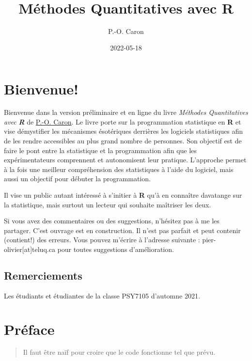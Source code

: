 \documentclass[
]{book}
\title{Méthodes Quantitatives avec R}
\author{P.-O. Caron}
\date{2022-05-18}
\begin{document}
\maketitle

{
\setcounter{tocdepth}{1}
\tableofcontents
}
\hypertarget{bienvenue}{%
\chapter*{Bienvenue!}\label{bienvenue}}

Bienvenue dans la version préliminaire et en ligne du livre \emph{Méthodes Quantitatives avec }\textbf{\emph{R}} de \href{https://www.teluq.ca/siteweb/univ/pcaron.html}{P.-O. Caron}. Le livre porte sur la programmation statistique en \textbf{R} et vise démystifier les mécanismes ésotériques derrières les logiciels statistiques afin de les rendre accessibles au plus grand nombre de personnes. Son objectif est de faire le pont entre la statistique et la programmation afin que les expérimentateurs comprennent et autonomisent leur pratique. L'approche permet à la fois une meilleur compréhension des statistiques à l'aide du logiciel, mais aussi un objectif pour débuter la programmation.

Il vise un public autant intéressé à s'initier à \textbf{R} qu'à en connaître davatange sur la statistique, mais surtout un lecteur qui souhaite maîtriser les deux.

Si vous avez des commentaires ou des suggestions, n'hésitez pas à me les partager. C'est ouvrage est en construction. Il n'est pas parfait et peut contenir (contient!) des erreurs. Vous pouvez m'écrire à l'adresse suivante : pier-olivier{[}at{]}teluq.ca pour toutes suggestions d'amélioration.

\hypertarget{remerciements}{%
\section*{Remerciements}\label{remerciements}}

Les étudiants et étudiantes de la classe PSY7105 d'automne 2021.

\hypertarget{pruxe9face}{%
\chapter*{Préface}\label{pruxe9face}}

\begin{quote}
Il faut être naïf pour croire que le code fonctionne tel que prévu.
\end{quote}
\end{document}
